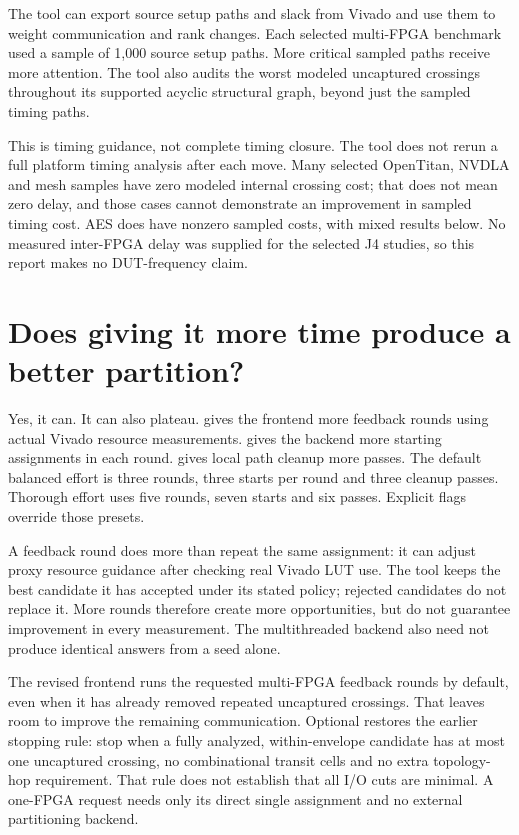 \documentclass[11pt]{article}
\newcommand{\code}[1]{\texttt{\detokenize{#1}}}
\begin{document}
The tool can export source setup paths and slack from Vivado and use them to weight communication and rank changes. Each selected multi-FPGA benchmark used a sample of 1,000 source setup paths. More critical sampled paths receive more attention. The tool also audits the worst modeled uncaptured crossings throughout its supported acyclic structural graph, beyond just the sampled timing paths.

This is timing guidance, not complete timing closure. The tool does not rerun a full platform timing analysis after each move. Many selected OpenTitan, NVDLA and mesh samples have zero modeled internal crossing cost; that does not mean zero delay, and those cases cannot demonstrate an improvement in sampled timing cost. AES does have nonzero sampled costs, with mixed results below. No measured inter-FPGA delay was supplied for the selected J4 studies, so this report makes no DUT-frequency claim.

\section{Does giving it more time produce a better partition?}

Yes, it can. It can also plateau. \code{--iterations} gives the frontend more feedback rounds using actual Vivado resource measurements. \code{--starts} gives the backend more starting assignments in each round. \code{--refine-passes} gives local path cleanup more passes. The default balanced effort is three rounds, three starts per round and three cleanup passes. Thorough effort uses five rounds, seven starts and six passes. Explicit flags override those presets.

A feedback round does more than repeat the same assignment: it can adjust proxy resource guidance after checking real Vivado LUT use. The tool keeps the best candidate it has accepted under its stated policy; rejected candidates do not replace it. More rounds therefore create more opportunities, but do not guarantee improvement in every measurement. The multithreaded backend also need not produce identical answers from a seed alone.

The revised frontend runs the requested multi-FPGA feedback rounds by default, even when it has already removed repeated uncaptured crossings. That leaves room to improve the remaining communication. Optional \code{--early-stop} restores the earlier stopping rule: stop when a fully analyzed, within-envelope candidate has at most one uncaptured crossing, no combinational transit cells and no extra topology-hop requirement. That rule does not establish that all I/O cuts are minimal. A one-FPGA request needs only its direct single assignment and no external partitioning backend.
\end{document}
